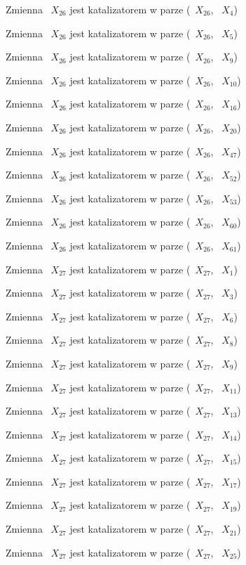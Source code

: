 \documentclass{article}
\begin{document}
Zmienna ~$X_{26}$ jest katalizatorem w parze (~$X_{26}$, ~$X_{4}$)

Zmienna ~$X_{26}$ jest katalizatorem w parze (~$X_{26}$, ~$X_{5}$)

Zmienna ~$X_{26}$ jest katalizatorem w parze (~$X_{26}$, ~$X_{9}$)

Zmienna ~$X_{26}$ jest katalizatorem w parze (~$X_{26}$, ~$X_{10}$)

Zmienna ~$X_{26}$ jest katalizatorem w parze (~$X_{26}$, ~$X_{16}$)

Zmienna ~$X_{26}$ jest katalizatorem w parze (~$X_{26}$, ~$X_{20}$)

Zmienna ~$X_{26}$ jest katalizatorem w parze (~$X_{26}$, ~$X_{47}$)

Zmienna ~$X_{26}$ jest katalizatorem w parze (~$X_{26}$, ~$X_{52}$)

Zmienna ~$X_{26}$ jest katalizatorem w parze (~$X_{26}$, ~$X_{53}$)

Zmienna ~$X_{26}$ jest katalizatorem w parze (~$X_{26}$, ~$X_{60}$)

Zmienna ~$X_{26}$ jest katalizatorem w parze (~$X_{26}$, ~$X_{61}$)

Zmienna ~$X_{27}$ jest katalizatorem w parze (~$X_{27}$, ~$X_{1}$)

Zmienna ~$X_{27}$ jest katalizatorem w parze (~$X_{27}$, ~$X_{3}$)

Zmienna ~$X_{27}$ jest katalizatorem w parze (~$X_{27}$, ~$X_{6}$)

Zmienna ~$X_{27}$ jest katalizatorem w parze (~$X_{27}$, ~$X_{8}$)

Zmienna ~$X_{27}$ jest katalizatorem w parze (~$X_{27}$, ~$X_{9}$)

Zmienna ~$X_{27}$ jest katalizatorem w parze (~$X_{27}$, ~$X_{11}$)

Zmienna ~$X_{27}$ jest katalizatorem w parze (~$X_{27}$, ~$X_{13}$)

Zmienna ~$X_{27}$ jest katalizatorem w parze (~$X_{27}$, ~$X_{14}$)

Zmienna ~$X_{27}$ jest katalizatorem w parze (~$X_{27}$, ~$X_{15}$)

Zmienna ~$X_{27}$ jest katalizatorem w parze (~$X_{27}$, ~$X_{17}$)

Zmienna ~$X_{27}$ jest katalizatorem w parze (~$X_{27}$, ~$X_{19}$)

Zmienna ~$X_{27}$ jest katalizatorem w parze (~$X_{27}$, ~$X_{21}$)

Zmienna ~$X_{27}$ jest katalizatorem w parze (~$X_{27}$, ~$X_{25}$)
\end{document}
